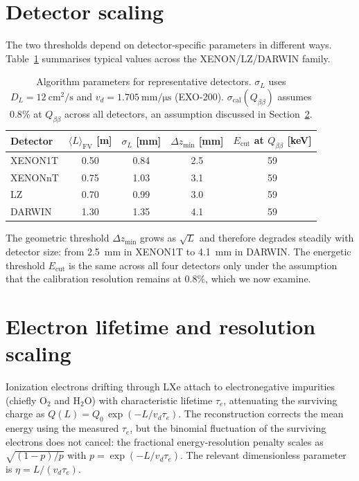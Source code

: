 \documentclass[11pt,a4paper]{article}
\begin{document}
\section{Detector scaling}

The two thresholds depend on detector-specific parameters in
different ways. Table~\ref{tab:detectors} summarises typical values
across the XENON/LZ/DARWIN family.

\begin{table}[h]
\centering
\caption{Algorithm parameters for representative detectors.
$\sigma_L$ uses $D_L = \SI{12}{\centi\meter\squared\per\second}$ and
$v_d = \SI{1.705}{\milli\meter\per\micro\second}$ (EXO-200).
$\sigma_{\mathrm{cal}}(Q_{\beta\beta})$ assumes $0.8\%$ at $Q_{\beta\beta}$
across all detectors, an assumption discussed in
Section~\ref{sec:scaling}.}
\label{tab:detectors}
\begin{tabular}{lcccc}
\toprule
Detector  & $\langle L\rangle_{\mathrm{FV}}$ [m]
          & $\sigma_L$ [mm]
          & $\Delta z_{\min}$ [mm]
          & $E_{\mathrm{cut}}$ at $Q_{\beta\beta}$ [keV] \\
\midrule
XENON1T & 0.50 & 0.84 & 2.5 & 59 \\
XENONnT & 0.75 & 1.03 & 3.1 & 59 \\
LZ      & 0.70 & 0.99 & 3.0 & 59 \\
DARWIN  & 1.30 & 1.35 & 4.1 & 59 \\
\bottomrule
\end{tabular}
\end{table}

The geometric threshold $\Delta z_{\min}$ grows as $\sqrt{L}$ and
therefore degrades steadily with detector size: from
\SI{2.5}{\milli\meter} in XENON1T to \SI{4.1}{\milli\meter} in DARWIN.
The energetic threshold $E_{\mathrm{cut}}$ is the same across all
four detectors only under the assumption that the calibration
resolution remains at $0.8\%$, which we now examine.

\section{Electron lifetime and resolution scaling}
\label{sec:scaling}

Ionization electrons drifting through LXe attach to electronegative
impurities (chiefly O$_2$ and H$_2$O) with characteristic lifetime
$\tau_e$, attenuating the surviving charge as
$Q(L) = Q_0\,\exp(-L/v_d\tau_e)$. The reconstruction corrects the
mean energy using the measured $\tau_e$, but the binomial fluctuation
of the surviving electrons does not cancel: the fractional
energy-resolution penalty scales as $\sqrt{(1-p)/p}$ with
$p = \exp(-L/v_d\tau_e)$. The relevant dimensionless parameter is
$\eta = L/(v_d\tau_e)$.
\end{document}

